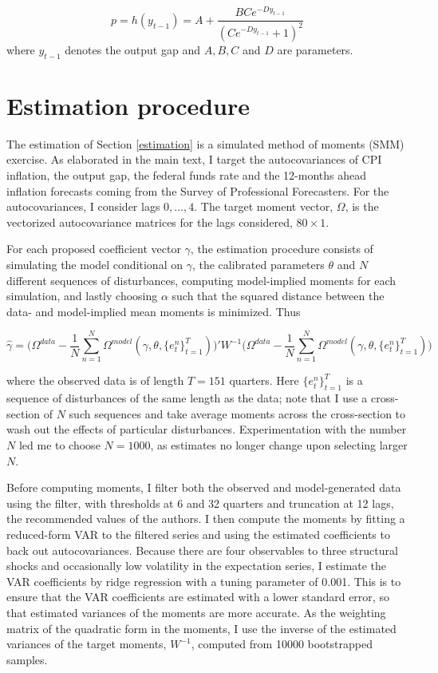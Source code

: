\documentclass[11pt]{article}
\renewcommand{\[}{\begin{equation}}
\renewcommand{\]}{\end{equation}}
\begin{document}
\begin{equation}
 p = h(y_{t-1}) = A + \frac{B C e^{-D y_{t-1}}}{( C e^{-D y_{t-1}}+1)^2}
\end{equation}
where $y_{t-1}$ denotes the output gap and $A,B,C$ and $D$ are parameters.

\section{Estimation procedure}\label{SMM}
The estimation of Section \ref{estimation} is a simulated method of moments (SMM) exercise. As elaborated in the main text, I target the autocovariances of CPI inflation, the output gap, the federal funds rate and the 12-months ahead inflation forecasts coming from the Survey of Professional Forecasters. For the autocovariances, I consider lags $0, \dots, 4$. The target moment vector, $\Omega$, is the vectorized autocovariance matrices for the lags considered, $80\times1$. 

For each proposed coefficient vector $\gamma$, the estimation procedure consists of simulating the model conditional on $\gamma$, the calibrated parameters $\theta$ and $N$ different sequences of disturbances, computing model-implied moments for each simulation, and lastly choosing $\alpha$ such that the squared distance between the data- and model-implied mean moments is minimized. Thus

\begin{equation}
\hat{\gamma} = \bigg(\Omega^{data}-\frac{1}{N}\sum_{n=1}^N\Omega^{model}(\gamma, \theta, \{e^n_t\}_{t=1}^{T})\bigg)' W^{-1} \bigg(\Omega^{data}-\frac{1}{N}\sum_{n=1}^N\Omega^{model}(\gamma, \theta,  \{e^n_t\}_{t=1}^{T})\bigg)
\label{GMM_loss}
\end{equation}

where the observed data is of length $T=151$ quarters. Here $\{e^n_t\}_{t=1}^{T}$ is a sequence of disturbances of the same length as the data; note that I use a cross-section of $N$ such sequences and take average moments across the cross-section to wash out the effects of particular disturbances. Experimentation with the number $N$ led me to choose $N=1000$, as estimates no longer change upon selecting larger $N$.

Before computing moments, I filter both the observed and model-generated data using the \cite{baxter1999measuring} filter, with thresholds at 6 and 32 quarters and truncation at 12 lags, the recommended values of the authors. I then compute the moments by fitting a reduced-form VAR to the filtered series and using the estimated coefficients to back out autocovariances.  Because there are four observables to three structural shocks and occasionally low volatility in the expectation series, I estimate the VAR coefficients by ridge regression with a tuning parameter of 0.001. This is to ensure that the VAR coefficients are estimated with a lower standard error, so that estimated variances of the moments are more accurate. As the weighting matrix of the quadratic form in the moments, I use the inverse of the estimated variances of the target moments, $W^{-1}$, computed from 10000 bootstrapped samples.  
\end{document}
